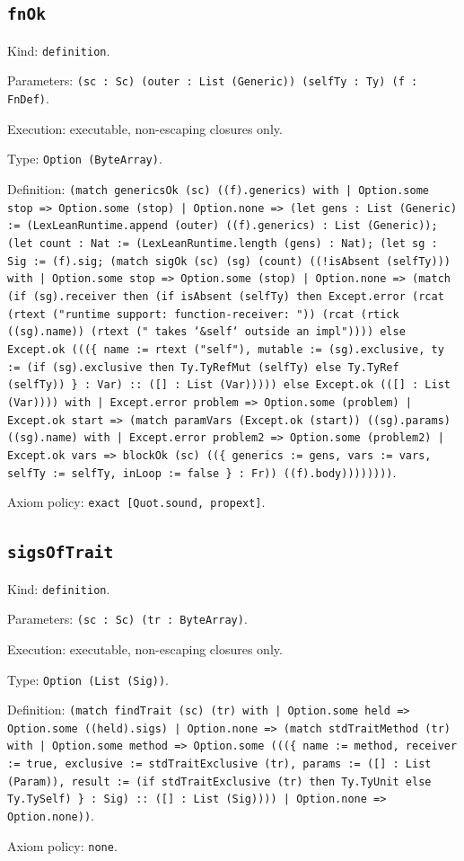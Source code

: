 \documentclass[11pt]{article}
\begin{document}
\subsection*{\texttt{fnOk}}
\noindent Kind: \texttt{definition}.\par
\noindent Parameters: \texttt{(sc : Sc) (outer : List (Generic)) (selfTy : Ty) (f : FnDef)}.\par
\noindent Execution: executable, non-escaping closures only.\par
\noindent Type: \texttt{Option (ByteArray)}.\par
\noindent Definition: \texttt{(match genericsOk (sc) ((f).generics) with | Option.some stop => Option.some (stop) | Option.none => (let gens : List (Generic) := (LexLeanRuntime.append (outer) ((f).generics) : List (Generic)); (let count : Nat := (LexLeanRuntime.length (gens) : Nat); (let sg : Sig := (f).sig; (match sigOk (sc) (sg) (count) ((!isAbsent (selfTy))) with | Option.some stop => Option.some (stop) | Option.none => (match (if (sg).receiver then (if isAbsent (selfTy) then Except.error (rcat (rtext ("runtime support: function-receiver: ")) (rcat (rtick ((sg).name)) (rtext (" takes `\&self` outside an impl")))) else Except.ok (((\{ name := rtext ("self"), mutable := (sg).exclusive, ty := (if (sg).exclusive then Ty.TyRefMut (selfTy) else Ty.TyRef (selfTy)) \} : Var) :: ([] : List (Var))))) else Except.ok (([] : List (Var)))) with | Except.error problem => Option.some (problem) | Except.ok start => (match paramVars (Except.ok (start)) ((sg).params) ((sg).name) with | Except.error problem2 => Option.some (problem2) | Except.ok vars => blockOk (sc) ((\{ generics := gens, vars := vars, selfTy := selfTy, inLoop := false \} : Fr)) ((f).body))))))))}.\par
\noindent Axiom policy: \texttt{exact [Quot.sound, propext]}.\par
\subsection*{\texttt{sigsOfTrait}}
\noindent Kind: \texttt{definition}.\par
\noindent Parameters: \texttt{(sc : Sc) (tr : ByteArray)}.\par
\noindent Execution: executable, non-escaping closures only.\par
\noindent Type: \texttt{Option (List (Sig))}.\par
\noindent Definition: \texttt{(match findTrait (sc) (tr) with | Option.some held => Option.some ((held).sigs) | Option.none => (match stdTraitMethod (tr) with | Option.some method => Option.some (((\{ name := method, receiver := true, exclusive := stdTraitExclusive (tr), params := ([] : List (Param)), result := (if stdTraitExclusive (tr) then Ty.TyUnit else Ty.TySelf) \} : Sig) :: ([] : List (Sig)))) | Option.none => Option.none))}.\par
\noindent Axiom policy: \texttt{none}.\par
\end{document}
